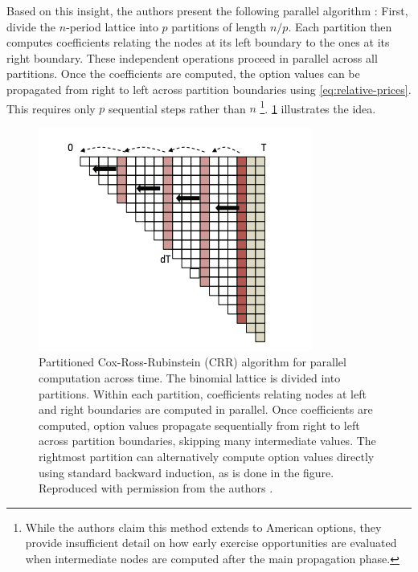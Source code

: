 \documentclass[english,12pt,a4paper,pdftex,sci,utf8]{aaltothesis}
\begin{document}
Based on this insight, the authors present the following parallel algorithm \cite{ganesan2009acceleration}: First, divide the $n$-period lattice into $p$ partitions of length $n/p$. Each partition then computes coefficients relating the nodes at its left boundary to the ones at its right boundary. These independent operations proceed in parallel across all partitions. Once the coefficients are computed, the option values can be propagated from right to left across partition boundaries using \cref{eq:relative-prices}. This requires only $p$ sequential steps rather than $n$ \footnote{While the authors claim this method extends to American options, they provide insufficient detail on how early exercise opportunities are evaluated when intermediate nodes are computed after the main propagation phase.}. \cref{fig:partitioned} illustrates the idea.

\begin{figure}[h]
    \centering
    \includegraphics[scale=0.6]{External Images/CRRpartitioned.png}
    \caption{Partitioned Cox-Ross-Rubinstein (CRR) algorithm for parallel computation across time. The binomial lattice is divided into partitions. Within each partition, coefficients relating nodes at left and right boundaries are computed in parallel. Once coefficients are computed, option values propagate sequentially from right to left across partition boundaries, skipping many intermediate values. The rightmost partition can alternatively compute option values directly using standard backward induction, as is done in the figure. Reproduced with permission from the authors \cite{ganesan2009acceleration}.}

    \label{fig:partitioned}
\end{figure}
\end{document}

